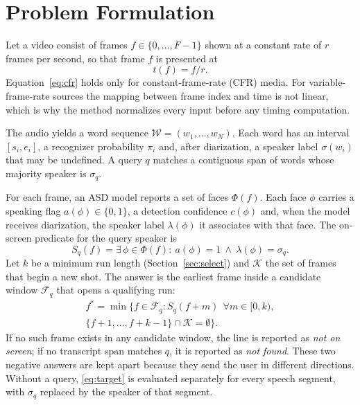 \documentclass[conference]{IEEEtran}
\begin{document}
\section{Problem Formulation}
\label{sec:problem}

Let a video consist of frames $f\in\{0,\dots,F-1\}$ shown at a constant rate of $r$ frames per second, so that frame $f$ is presented at
\begin{equation}
t(f)=f/r .
\label{eq:cfr}
\end{equation}
Equation~\eqref{eq:cfr} holds only for constant-frame-rate (CFR) media. For variable-frame-rate sources the mapping between frame index and time is not linear, which is why the method normalizes every input before any timing computation.

The audio yields a word sequence $\mathcal{W}=(w_1,\dots,w_N)$. Each word has an interval $[s_i,e_i]$, a recognizer probability $\pi_i$ and, after diarization, a speaker label $\sigma(w_i)$ that may be undefined. A query $q$ matches a contiguous span of words whose majority speaker is $\sigma_q$.

For each frame, an ASD model reports a set of faces $\Phi(f)$. Each face $\phi$ carries a speaking flag $a(\phi)\in\{0,1\}$, a detection confidence $c(\phi)$ and, when the model receives diarization, the speaker label $\lambda(\phi)$ it associates with that face. The on-screen predicate for the query speaker is
\begin{equation}
S_q(f)=\exists\,\phi\in\Phi(f):\ a(\phi)=1\ \wedge\ \lambda(\phi)=\sigma_q .
\label{eq:pred}
\end{equation}
Let $k$ be a minimum run length (Section~\ref{sec:select}) and $\mathcal{K}$ the set of frames that begin a new shot. The answer is the earliest frame inside a candidate window $\mathcal{F}_q$ that opens a qualifying run:
\begin{multline}
f^\ast=\min\bigl\{f\in\mathcal{F}_q : S_q(f+m)\ \ \forall m\in[0,k), \\
\{f+1,\dots,f+k-1\}\cap\mathcal{K}=\emptyset\bigr\}.
\label{eq:target}
\end{multline}
If no such frame exists in any candidate window, the line is reported as \emph{not on screen}; if no transcript span matches $q$, it is reported as \emph{not found}. These two negative answers are kept apart because they send the user in different directions. Without a query, \eqref{eq:target} is evaluated separately for every speech segment, with $\sigma_q$ replaced by the speaker of that segment.
\end{document}
